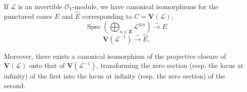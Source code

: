 \begin{proposition}[8.4.4]
\label{II.8.4.4}
If $\mathcal{L}$ is an invertible $\mathcal{O}_Y$-module, we have
canonical isomorphisms for the punctured cones $E$ and $\widehat{E}$
corresponding to $C=\mathbf{V}(\mathcal{L})$,
\begin{equation}
\label{II.8.4.4.1}
  \operatorname{Spec}\left(
    \bigoplus_{n\in\mathbf{Z}}\mathcal{L}^{\otimes n}
  \right)\xrightarrow{\sim}E
\tag{8.4.4.1}
\end{equation}
\begin{equation}
\label{II.8.4.4.2}
  \mathbf{V}(\mathcal{L}^{-1})\xrightarrow{\sim}\widehat{E}.
\tag{8.4.4.2}
\end{equation}

Moreover, there exists a canonical isomorphism of the projective closure of
$\mathbf{V}(\mathcal{L})$ onto that of $\mathbf{V}(\mathcal{L}^{-1})$,
transforming the zero section (resp. the locus at infinity) of the first into the
locus at infinity (resp. the zero section) of the second.
\end{proposition}

